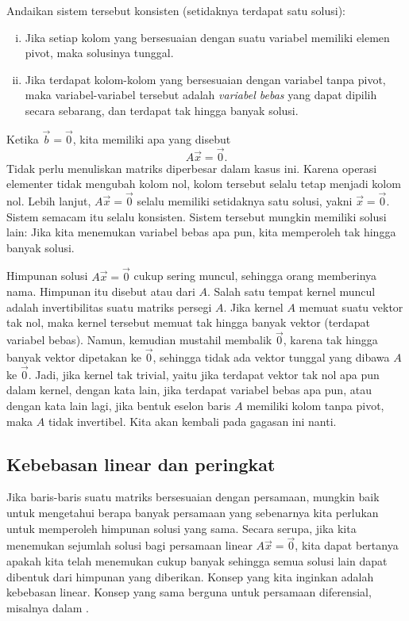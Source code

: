 Andaikan sistem tersebut konsisten (setidaknya terdapat satu solusi):
\begin{enumerate}[(i)]
\item Jika setiap kolom yang bersesuaian dengan suatu variabel memiliki elemen pivot,
maka solusinya tunggal.
\item Jika terdapat kolom-kolom yang bersesuaian dengan variabel tanpa pivot,
maka variabel-variabel tersebut adalah \emph{variabel bebas} yang dapat dipilih
secara sebarang, dan terdapat tak hingga banyak solusi.
\end{enumerate}

\medskip

Ketika $\vec{b} = \vec{0}$, kita memiliki apa yang disebut
\emph{}
\begin{equation*}
A \vec{x} = \vec{0} .
\end{equation*}
Tidak perlu menuliskan matriks diperbesar dalam
kasus ini. Karena operasi elementer tidak mengubah kolom nol,
kolom tersebut selalu tetap menjadi kolom nol. Lebih lanjut, $A \vec{x} = \vec{0}$ selalu memiliki
setidaknya satu solusi, yakni $\vec{x} = \vec{0}$. Sistem semacam itu
selalu konsisten. Sistem tersebut mungkin memiliki solusi lain: Jika kita menemukan
variabel bebas apa pun, kita memperoleh tak hingga banyak solusi.

Himpunan solusi $A \vec{x} = \vec{0}$ cukup sering muncul,
sehingga orang memberinya nama. Himpunan itu disebut
\emph{} atau
\emph{} dari $A$.
Salah satu tempat kernel muncul adalah invertibilitas suatu matriks persegi $A$.
Jika kernel $A$ memuat suatu vektor tak nol, maka kernel tersebut memuat
tak hingga banyak vektor (terdapat variabel bebas). Namun, kemudian
mustahil membalik $\vec{0}$, karena tak hingga banyak vektor dipetakan ke
$\vec{0}$, sehingga tidak ada vektor tunggal yang dibawa $A$ ke $\vec{0}$.
Jadi, jika kernel tak trivial, yaitu jika terdapat vektor tak nol apa pun dalam
kernel,
dengan kata lain, jika terdapat variabel bebas apa pun, atau dengan kata lain lagi,
jika bentuk eselon baris $A$ memiliki kolom tanpa pivot,
maka $A$ tidak invertibel. Kita akan kembali pada gagasan ini nanti.

\subsection{Kebebasan linear dan peringkat}

Jika baris-baris suatu matriks bersesuaian dengan persamaan, mungkin baik untuk mengetahui
berapa banyak persamaan yang sebenarnya kita perlukan untuk memperoleh himpunan solusi yang sama.
Secara serupa, jika kita menemukan sejumlah solusi bagi persamaan linear
$A \vec{x} = \vec{0}$, kita dapat bertanya apakah kita telah menemukan cukup banyak
sehingga semua solusi lain dapat dibentuk dari himpunan yang diberikan.
Konsep yang kita inginkan adalah kebebasan linear.
Konsep yang sama berguna untuk persamaan diferensial, misalnya
dalam .

